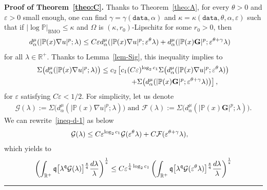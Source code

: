 \documentclass[a4paper, 11pt]{article}
\newenvironment{proof}[1][Proof]{\textbf{#1.} }{\hfill\rule{0.5em}{0.5em}}
\begin{document}
\begin{proof}[Proof of Theorem~\ref{theo:C}]
Thanks to Theorem~\ref{theo:A}, for every $\theta>0$ and $\varepsilon>0$ small enough, one can find $\gamma = \gamma(\mathtt{data},\alpha)$ and $\kappa = \kappa(\mathtt{data},\theta,\alpha,\varepsilon)$ such that if $|\log \mathbb{P}|_{\mathrm{BMO}} \le \kappa$ and $\Omega$ is $(\kappa,r_0)$-Lipschitz for some $r_0>0$, then 
\begin{align}\notag
 & d^{\mu}_{\alpha}(|\mathbb{P}(x)\nabla u|^{p};\lambda) \le C \varepsilon d^{\mu}_{\alpha}(|\mathbb{P}(x)\nabla u|^{p};\varepsilon^{\theta}\lambda) + d^{\mu}_{\alpha}(|\mathbb{P}(x)\mathbf{G}|^{p};\varepsilon^{\theta+\gamma}\lambda)
\end{align}
for all $\lambda \in \mathbb{R}^+$. Thanks to Lemma~\ref{lem-Sig}, this inequality implies to
\begin{align}\label{ineq-d-1}
 \Sigma\big(d^{\mu}_{\alpha}(|\mathbb{P}(x)\nabla u|^{p};\lambda)\big) &\le c_2 \left[c_1 (C \varepsilon)^{\log_2 c_1} \Sigma \big(d^{\mu}_{\alpha}(|\mathbb{P}(x)\nabla u|^{p};\varepsilon^{\theta}\lambda)\big) \right. \notag \\
 & \qquad \qquad  \left. + \Sigma \big(d^{\mu}_{\alpha}(|\mathbb{P}(x)\mathbf{G}|^{p};\varepsilon^{\theta+\gamma}\lambda)\big) \right],
\end{align}
for $\varepsilon$ satisfying $C\varepsilon<1/2$. For simplicity, let us denote
\begin{align*}
\mathcal{G}(\lambda) := \Sigma\big(d^{\mu}_{\alpha}(|\mathbb{P}(x)\nabla u|^{p};\lambda)\big) \mbox{ and } \mathcal{F}(\lambda) := \Sigma \big(d^{\mu}_{\alpha}(|\mathbb{P}(x)\mathbf{G}|^{p};\lambda)\big).
\end{align*}
We can rewrite~\eqref{ineq-d-1} as below
\begin{align}\notag
\mathcal{G}(\lambda) &\le C \varepsilon^{\log_2 c_1} \mathcal{G}(\varepsilon^{\theta}\lambda) + C \mathcal{F}(\varepsilon^{\theta+\gamma}\lambda),
\end{align}
which yields to
\begin{align}
\left(\int_{\mathbb{R}^+} \mathfrak{q} \big[\lambda^{\mathfrak{q}}\mathcal{G}(\lambda)\big]^{\frac{\mathfrak{s}}{\mathfrak{q}}} \frac{d\lambda}{\lambda}\right)^{\frac{1}{\mathfrak{s}}} &\le C \varepsilon^{\frac{1}{\mathfrak{q}}\log_2 c_1} \left(\int_{\mathbb{R}^+} \mathfrak{q} \big[\lambda^{\mathfrak{q}}\mathcal{G}(\varepsilon^{\theta}\lambda)\big]^{\frac{\mathfrak{s}}{\mathfrak{q}}} \frac{d\lambda}{\lambda}\right)^{\frac{1}{\mathfrak{s}}} \notag \\

\end{align}
\end{proof}
\end{document}
